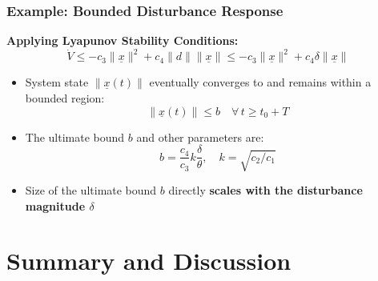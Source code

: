 \documentclass[student, noshadow, lsr, english, aspectratio=169, t]{ITR_LSR_slides}
\begin{document}
\begin{frame}
    \frametitle{Example: Bounded Disturbance Response}

    \textbf{Applying Lyapunov Stability Conditions:}
		\[ \dot{V} \leq -c_3 \|\underline{x}\|^2 + c_4 \|d\| \|\underline{x}\| \leq -c_3 \|\underline{x}\|^2 + c_4 \delta \|\underline{x}\| \]


    \vspace{-0.1cm}
    \begin{tcolorbox}[title=Conclusion: Ultimate Boundedness Guaranteed]
        \begin{itemize}
            \item System state $\|\underline{x}(t)\|$ eventually converges to and remains within a bounded region:
                  \[ \|\underline{x}(t)\| \leq b \quad \forall\, t \geq t_0 + T \]
            \item The ultimate bound $b$ and other parameters are:
                  \[ b = \frac{c_4}{c_3} k \frac{\delta}{\theta}, \quad k = \sqrt{c_2/c_1} \]
            \item Size of the ultimate bound $b$ directly \textbf{scales with the disturbance magnitude $\delta$}
        \end{itemize}
    \end{tcolorbox}
\end{frame}


\section{Summary and Discussion}
\end{document}
